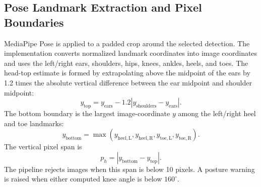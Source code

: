 \documentclass[conference]{IEEEtran}
\begin{document}
\subsection{Pose Landmark Extraction and Pixel Boundaries}
MediaPipe Pose is applied to a padded crop around the selected detection. The implementation converts normalized landmark coordinates into image coordinates and uses the left/right ears, shoulders, hips, knees, ankles, heels, and toes. The head-top estimate is formed by extrapolating above the midpoint of the ears by 1.2 times the absolute vertical difference between the ear midpoint and shoulder midpoint:
\begin{equation}
y_{\mathrm{top}} = y_{\mathrm{ears}} -
1.2\left|y_{\mathrm{shoulders}}-y_{\mathrm{ears}}\right|.
\label{eq:headtop}
\end{equation}
The bottom boundary is the largest image-coordinate $y$ among the left/right heel and toe landmarks:
\begin{equation}
y_{\mathrm{bottom}}=\max(y_{\mathrm{heel,L}},y_{\mathrm{heel,R}},
y_{\mathrm{toe,L}},y_{\mathrm{toe,R}}).
\label{eq:bottom}
\end{equation}
The vertical pixel span is
\begin{equation}
p_h = |y_{\mathrm{bottom}}-y_{\mathrm{top}}|.
\label{eq:pixelheight}
\end{equation}
The pipeline rejects images when this span is below 10 pixels. A posture warning is raised when either computed knee angle is below $160^\circ$.
\end{document}
